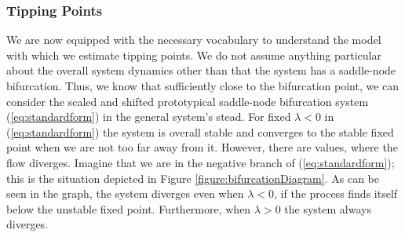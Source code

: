 \subsubsection{Tipping Points}
We are now equipped with the necessary vocabulary to understand the model with which we estimate tipping points. We do not assume anything particular about the overall system dynamics other than that the system has a saddle-node bifurcation. Thus, we know that sufficiently close to the bifurcation point, we can consider the scaled and shifted prototypical saddle-node bifurcation system (\ref{eq:standardform}) in the general system's stead. For fixed $\lambda < 0$ in (\ref{eq:standardform}) the system is overall stable and converges to the stable fixed point when we are not too far away from it. However, there are values, where the flow  diverges. Imagine that we are in the negative branch of (\ref{eq:standardform}); this is the situation depicted in Figure \ref{figure:bifurcationDiagram}. As can be seen in the graph, the system diverges even when $\lambda<0$, if the process finds itself below the unstable fixed point. Furthermore, when $\lambda>0$ the system always diverges.

